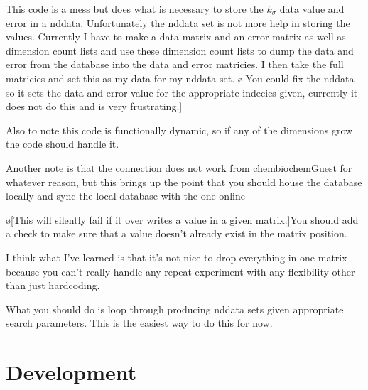 \documentclass[10pt]{book}
\begin{document}
This code is a mess but does what is necessary to store the $k_{\sigma}$ data value and error in a nddata. Unfortunately the nddata set is not more help in storing the values. Currently I have to make a data matrix and an error matrix as well as dimension count lists and use these dimension count lists to dump the data and error from the database into the data and error matricies. I then take the full matricies and set this as my data for my nddata set. \o[You could fix the nddata so it sets the data and error value for the appropriate indecies given, currently it does not do this and is very frustrating.]{}

Also to note this code is functionally dynamic, so if any of the dimensions grow the code should handle it.

Another note is that the connection does not work from chembiochemGuest for whatever reason, but this brings up the point that you should house the database locally and sync the local database with the one online 

\o[This will silently fail if it over writes a value in a given matrix.]{You should add a check to make sure that a value doesn't already exist in the matrix position.}

I think what I've learned is that it's not nice to drop everything in one matrix because you can't really handle any repeat experiment with any flexibility other than just hardcoding.

What you should do is loop through producing nddata sets given appropriate search parameters. This is the easiest way to do this for now. 

\chapter{Development}
\end{document}
